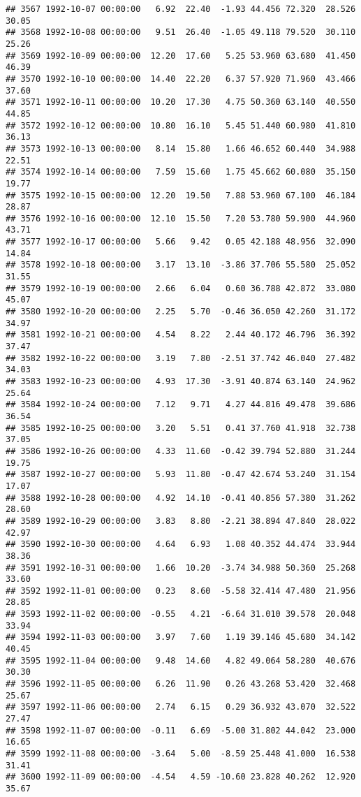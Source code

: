 \documentclass{article}\usepackage{graphicx, color}
\makeatletter
\newenvironment{kframe}{%
 \def\at@end@of@kframe{}%
 \ifinner\ifhmode%
  \def\at@end@of@kframe{\end{minipage}}%
  \begin{minipage}{\columnwidth}%
 \fi\fi%
 \def\FrameCommand##1{\hskip\@totalleftmargin \hskip-\fboxsep
 \colorbox{shadecolor}{##1}\hskip-\fboxsep
     \hskip-\linewidth \hskip-\@totalleftmargin \hskip\columnwidth}%
 \MakeFramed {\advance\hsize-\width
   \@totalleftmargin\z@ \linewidth\hsize
   \@setminipage}}%
 {\par\unskip\endMakeFramed%
 \at@end@of@kframe}
\newenvironment{knitrout}{}{} %
\makeatother
\begin{document}
\begin{knitrout}
\begin{kframe}
\begin{verbatim}
## 3567 1992-10-07 00:00:00   6.92  22.40  -1.93 44.456 72.320  28.526  30.05
## 3568 1992-10-08 00:00:00   9.51  26.40  -1.05 49.118 79.520  30.110  25.26
## 3569 1992-10-09 00:00:00  12.20  17.60   5.25 53.960 63.680  41.450  46.39
## 3570 1992-10-10 00:00:00  14.40  22.20   6.37 57.920 71.960  43.466  37.60
## 3571 1992-10-11 00:00:00  10.20  17.30   4.75 50.360 63.140  40.550  44.85
## 3572 1992-10-12 00:00:00  10.80  16.10   5.45 51.440 60.980  41.810  36.13
## 3573 1992-10-13 00:00:00   8.14  15.80   1.66 46.652 60.440  34.988  22.51
## 3574 1992-10-14 00:00:00   7.59  15.60   1.75 45.662 60.080  35.150  19.77
## 3575 1992-10-15 00:00:00  12.20  19.50   7.88 53.960 67.100  46.184  28.87
## 3576 1992-10-16 00:00:00  12.10  15.50   7.20 53.780 59.900  44.960  43.71
## 3577 1992-10-17 00:00:00   5.66   9.42   0.05 42.188 48.956  32.090  14.84
## 3578 1992-10-18 00:00:00   3.17  13.10  -3.86 37.706 55.580  25.052  31.55
## 3579 1992-10-19 00:00:00   2.66   6.04   0.60 36.788 42.872  33.080  45.07
## 3580 1992-10-20 00:00:00   2.25   5.70  -0.46 36.050 42.260  31.172  34.97
## 3581 1992-10-21 00:00:00   4.54   8.22   2.44 40.172 46.796  36.392  37.47
## 3582 1992-10-22 00:00:00   3.19   7.80  -2.51 37.742 46.040  27.482  34.03
## 3583 1992-10-23 00:00:00   4.93  17.30  -3.91 40.874 63.140  24.962  25.64
## 3584 1992-10-24 00:00:00   7.12   9.71   4.27 44.816 49.478  39.686  36.54
## 3585 1992-10-25 00:00:00   3.20   5.51   0.41 37.760 41.918  32.738  37.05
## 3586 1992-10-26 00:00:00   4.33  11.60  -0.42 39.794 52.880  31.244  19.75
## 3587 1992-10-27 00:00:00   5.93  11.80  -0.47 42.674 53.240  31.154  17.07
## 3588 1992-10-28 00:00:00   4.92  14.10  -0.41 40.856 57.380  31.262  28.60
## 3589 1992-10-29 00:00:00   3.83   8.80  -2.21 38.894 47.840  28.022  42.97
## 3590 1992-10-30 00:00:00   4.64   6.93   1.08 40.352 44.474  33.944  38.36
## 3591 1992-10-31 00:00:00   1.66  10.20  -3.74 34.988 50.360  25.268  33.60
## 3592 1992-11-01 00:00:00   0.23   8.60  -5.58 32.414 47.480  21.956  28.85
## 3593 1992-11-02 00:00:00  -0.55   4.21  -6.64 31.010 39.578  20.048  33.94
## 3594 1992-11-03 00:00:00   3.97   7.60   1.19 39.146 45.680  34.142  40.45
## 3595 1992-11-04 00:00:00   9.48  14.60   4.82 49.064 58.280  40.676  30.30
## 3596 1992-11-05 00:00:00   6.26  11.90   0.26 43.268 53.420  32.468  25.67
## 3597 1992-11-06 00:00:00   2.74   6.15   0.29 36.932 43.070  32.522  27.47
## 3598 1992-11-07 00:00:00  -0.11   6.69  -5.00 31.802 44.042  23.000  16.65
## 3599 1992-11-08 00:00:00  -3.64   5.00  -8.59 25.448 41.000  16.538  31.41
## 3600 1992-11-09 00:00:00  -4.54   4.59 -10.60 23.828 40.262  12.920  35.67

\end{verbatim}
\end{kframe}
\end{knitrout}
\end{document}
